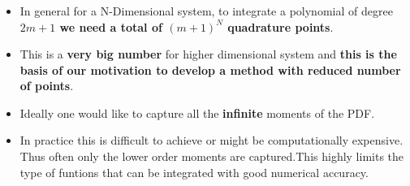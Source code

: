 \documentclass{beamer}
\begin{document}
\begin{frame}
\frametitle{}
\begin{itemize}
\item In general for a N-Dimensional system, to integrate a polynomial of degree{\bf  $2m+1$ we need a total of $(m+1)^N$ quadrature points}. 
\item This is a {\bf very big number} for higher dimensional system and {\bf this is the basis of {\bf our motivation} to develop a method with reduced number of points}. 
\item Ideally one would like to capture all the {\bf infinite} moments of the PDF.
\item In practice this is difficult to achieve or might be computationally expensive. Thus often only the lower order moments are captured.This highly limits the type of funtions that can be integrated with good numerical accuracy.
\end{itemize}
\end{frame}
\end{document}
